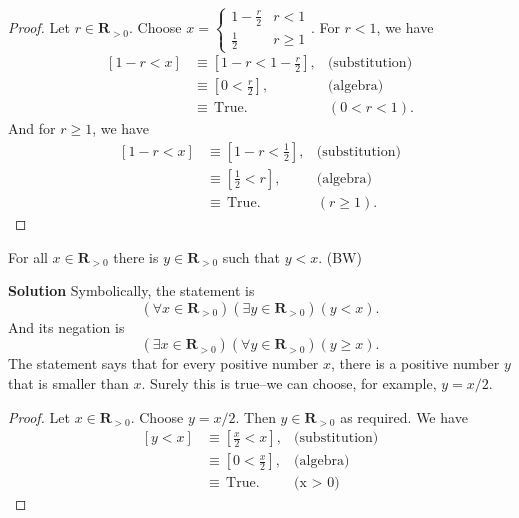 \documentclass[12pt,fleqn,answers]{exam}
\newcommand{\reals}{\mathbf{R}}
\newcommand{\true}{\, \mathrm{True}}
\newenvironment{myproof}
  {\begin{shaded}\begin{proof}}
  {\end{proof}\end{shaded}}
\begin{document}
\begin{questions}
      \begin{myproof} Let $r \in \reals_{>0}$. Choose $x = \begin{cases} 1 - \frac{r}{2}  & r < 1 \\ \frac{1}{2} & r \geq 1 \end{cases}$. For $r < 1$, we have
      \begin{align*}
       \left[1-r < x \right] &\equiv \left[1-r < 1 - \frac{r}{2}  \right], & \mbox{(substitution)} \\
                                  &\equiv  \left[0 <  \frac{r}{2}  \right], & \mbox{(algebra)} \\
                                  &\equiv \true.   &(0 < r < 1).
      \end{align*}
      And for $r \geq 1$, we have
       \begin{align*}
       \left[1-r < x \right] &\equiv \left[1-r < \frac{1}{2}  \right], & \mbox{(substitution)} \\
                                  &\equiv  \left[\frac{1}{2}  <  r  \right], & \mbox{(algebra)} \\
                                  &\equiv \true.   &(r \geq 1).
      \end{align*}
      \end{myproof}
     
     \question For all $x \in \reals_{>0}$ there is $y \in \reals_{> 0}$ such that $y < x$. \hfill (BW) 
     
        \textbf{Solution} Symbolically, the statement is 
      \begin{equation*}
         \left(\forall x \in \reals_{>0}\right) \left(\exists y \in \reals_{>0}\right)(y < x).
      \end{equation*}
      And its negation is
       \begin{equation*}
         \left(\exists x \in \reals_{>0}\right) \left(\forall y \in \reals_{>0}\right)(y \geq  x).
      \end{equation*}
      The statement says that for every positive number $x$, there is a positive number $y$ that is smaller than $x$. 
      Surely this is true--we can choose, for example, $y=x/2$.
      
      \begin{myproof} Let $x \in \reals_{>0}$. Choose $y = x/2$. Then $y \in \reals_{>0}$ as required. We have
         \begin{align*}
         \left[y < x \right] &\equiv \left[\frac{x}{2} < x \right], &\mbox{(substitution)} \\
                                   &\equiv \left[0 < \frac{x}{2}  \right], &\mbox{(algebra)} \\
                                   &\equiv \true.  &\mbox{(x > 0)}
      \end{align*}
      \end{myproof}
      

\end{questions}
\end{document}
